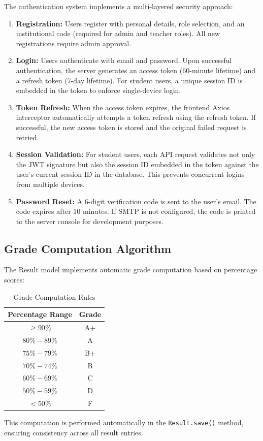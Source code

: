The authentication system implements a multi-layered security approach:

\begin{enumerate}[label=\arabic*., leftmargin=2em]
    \item \textbf{Registration:} Users register with personal details, role selection, and an institutional code (required for admin and teacher roles). All new registrations require admin approval.
    
    \item \textbf{Login:} Users authenticate with email and password. Upon successful authentication, the server generates an access token (60-minute lifetime) and a refresh token (7-day lifetime). For student users, a unique session ID is embedded in the token to enforce single-device login.
    
    \item \textbf{Token Refresh:} When the access token expires, the frontend Axios interceptor automatically attempts a token refresh using the refresh token. If successful, the new access token is stored and the original failed request is retried.
    
    \item \textbf{Session Validation:} For student users, each API request validates not only the JWT signature but also the session ID embedded in the token against the user's current session ID in the database. This prevents concurrent logins from multiple devices.
    
    \item \textbf{Password Reset:} A 6-digit verification code is sent to the user's email. The code expires after 10 minutes. If SMTP is not configured, the code is printed to the server console for development purposes.
\end{enumerate}

\subsection{Grade Computation Algorithm}

The Result model implements automatic grade computation based on percentage scores:

\begin{table}[H]
\centering
\caption{Grade Computation Rules}
\label{tab:grades}
\begin{tabular}{|c|c|}
\hline
\textbf{Percentage Range} & \textbf{Grade} \\
\hline
$\geq 90\%$ & A+ \\
\hline
$80\% - 89\%$ & A \\
\hline
$75\% - 79\%$ & B+ \\
\hline
$70\% - 74\%$ & B \\
\hline
$60\% - 69\%$ & C \\
\hline
$50\% - 59\%$ & D \\
\hline
$< 50\%$ & F \\
\hline
\end{tabular}
\end{table}

This computation is performed automatically in the \texttt{Result.save()} method, ensuring consistency across all result entries.
